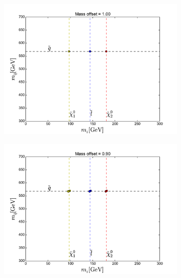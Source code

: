 \documentclass[twoside,english]{uiofysmaster}
\begin{document}
\begin{figure}[hbt]
	\centering
	\begin{subfigure}[b]{0.49\textwidth}
		\includegraphics[width=\textwidth]{figures/25_events_simplistic_scipy_nelder-mead_without_smearing_1p00_initial_guess.pdf} 
		\caption{}
	\end{subfigure}
	\begin{subfigure}[b]{0.49\textwidth}
		\includegraphics[width=\textwidth]{figures/25_events_simplistic_scipy_nelder-mead_without_smearing_0p90_initial_guess.pdf} 
		\caption{}
	\end{subfigure}


\end{figure}
\end{document}
